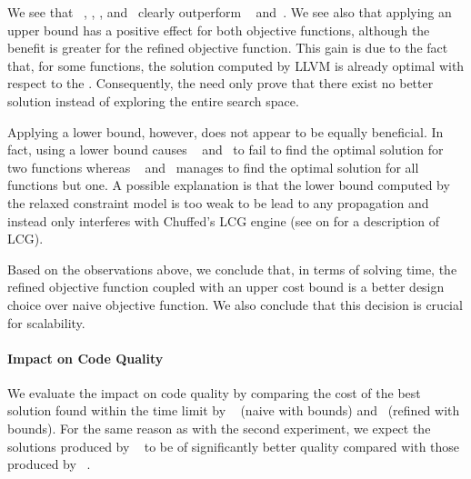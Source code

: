 We see that ~,
, ,
and~ clearly outperform ~ and~.
%
We see also that applying an upper bound has a positive effect for both
\glspl{objective function}, although the benefit is greater for the refined
\gls{objective function}.
%
This gain is due to the fact that, for some \glspl{function}, the \gls{solution}
computed by \gls{LLVM} is already optimal with respect to the
.
%
Consequently, the  need only prove that there exist
no better \gls{solution} instead of exploring the entire \gls{search space}.

Applying a lower bound, however, does not appear to be equally beneficial.
%
In fact, using a lower bound causes ~ and~ to
fail to find the optimal \gls{solution} for two \glspl{function} whereas
~
and~ manages to find the optimal \gls{solution} for
all \glspl{function} but one.
%
A possible explanation is that the lower bound computed by the relaxed
\gls{constraint model} is too weak to be lead to any \gls{propagation} and
instead only interferes with \gls{Chuffed}'s \gls{LCG} engine (see
 on
 for a description of \gls{LCG}).

Based on the observations above, we conclude that, in terms of solving time, the
refined \gls{objective function} coupled with an upper cost bound is a better
design choice over naive \gls{objective function}.
%
We also conclude that this decision is crucial for scalability.


\paragraph{Impact on Code Quality}

We evaluate the impact on code quality by comparing the cost of the best
\gls{solution} found within the time limit by ~ (naive  with
bounds) and~ (refined  with bounds).
%
For the same reason as with the second experiment, we expect the
\glspl{solution} produced by ~ to be of significantly better quality
compared with those produced by ~.

